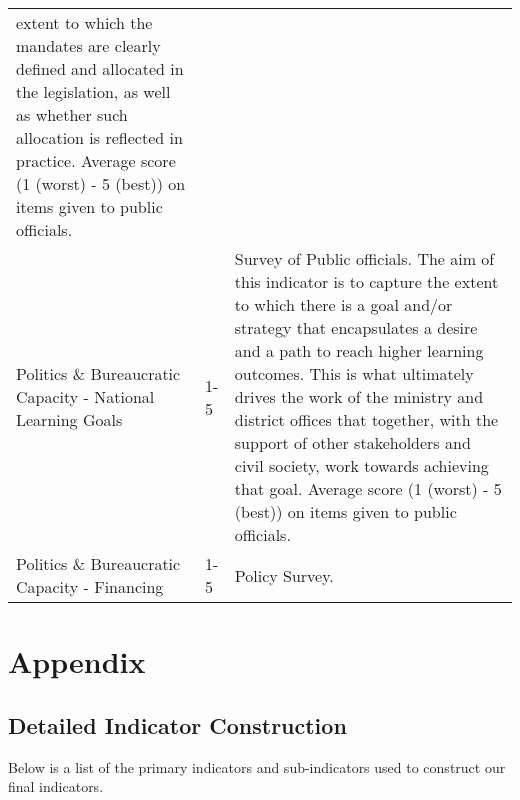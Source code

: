 \documentclass[]{article}
\begin{document}
\begin{longtable}[]{@{}lll@{}}
extent to which the mandates are clearly defined and allocated in the
legislation, as well as whether such allocation is reflected in
practice. Average score (1 (worst) - 5 (best)) on items given to public
officials.\tabularnewline
Politics \& Bureaucratic Capacity - National Learning Goals & 1-5 &
Survey of Public officials. The aim of this indicator is to capture the
extent to which there is a goal and/or strategy that encapsulates a
desire and a path to reach higher learning outcomes. This is what
ultimately drives the work of the ministry and district offices that
together, with the support of other stakeholders and civil society, work
towards achieving that goal. Average score (1 (worst) - 5 (best)) on
items given to public officials.\tabularnewline
Politics \& Bureaucratic Capacity - Financing & 1-5 & Policy
Survey.\tabularnewline
\bottomrule
\end{longtable}

\hypertarget{appendix}{%
\section{Appendix}\label{appendix}}

\hypertarget{detailed-indicator-construction}{%
\subsection{Detailed Indicator
Construction}\label{detailed-indicator-construction}}

Below is a list of the primary indicators and sub-indicators used to
construct our final indicators.
\end{document}
